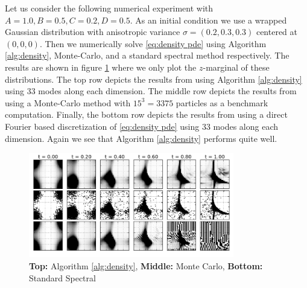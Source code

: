 \documentclass[final,leqno]{siamltex1213}
\begin{document}
%
Let us consider the following numerical experiment with $A=1.0,B=0.5,C=0.2,D=0.5$.
As an initial condition we use a wrapped Gaussian distribution with anisotropic variance $\sigma= (0.2, 0.3, 0.3)$ centered at $(0,0,0)$.
Then we numerically solve \eqref{eq:density pde} using Algorithm \ref{alg:density}, Monte-Carlo, and a standard spectral method respectively.
The results are shown in figure \ref{fig:ABCD} where we only plot the $z$-marginal of these distributions.
The top row depicts the results from using Algorithm \ref{alg:density} using 33 modes along each dimension.
The middle row depicts the results from using a Monte-Carlo method with $15^{3} = 3375$ particles as a benchmark computation.
Finally, the bottom row depicts the results from using a direct Fourier based discretization of \eqref{eq:density pde} using 33 modes along each dimension.
Again we see that Algorithm \ref{alg:density} performs quite well.


\begin{figure}
	\centering
	\includegraphics[width=0.8\textwidth]{./images/ABCD_flow.png}
	\caption{ \tiny {\bf Top:} Algorithm \ref{alg:density}, {\bf Middle:} Monte Carlo, {\bf Bottom:} Standard Spectral}
	\label{fig:ABCD}
\end{figure}
\end{document}
